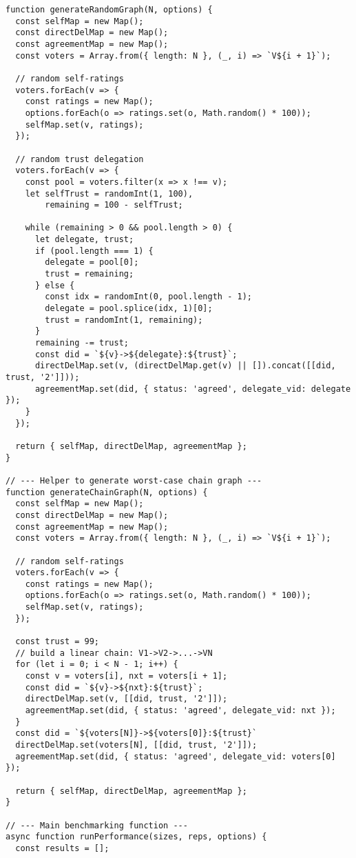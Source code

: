 \begin{verbatim}
function generateRandomGraph(N, options) {
  const selfMap = new Map();
  const directDelMap = new Map();
  const agreementMap = new Map();
  const voters = Array.from({ length: N }, (_, i) => `V${i + 1}`);

  // random self-ratings
  voters.forEach(v => {
    const ratings = new Map();
    options.forEach(o => ratings.set(o, Math.random() * 100));
    selfMap.set(v, ratings);
  });

  // random trust delegation
  voters.forEach(v => {
    const pool = voters.filter(x => x !== v);
    let selfTrust = randomInt(1, 100),
        remaining = 100 - selfTrust;

    while (remaining > 0 && pool.length > 0) {
      let delegate, trust;
      if (pool.length === 1) {
        delegate = pool[0];
        trust = remaining;
      } else {
        const idx = randomInt(0, pool.length - 1);
        delegate = pool.splice(idx, 1)[0];
        trust = randomInt(1, remaining);
      }
      remaining -= trust;
      const did = `${v}->${delegate}:${trust}`;
      directDelMap.set(v, (directDelMap.get(v) || []).concat([[did, trust, '2']]));
      agreementMap.set(did, { status: 'agreed', delegate_vid: delegate });
    }
  });

  return { selfMap, directDelMap, agreementMap };
}

// --- Helper to generate worst-case chain graph ---
function generateChainGraph(N, options) {
  const selfMap = new Map();
  const directDelMap = new Map();
  const agreementMap = new Map();
  const voters = Array.from({ length: N }, (_, i) => `V${i + 1}`);

  // random self-ratings
  voters.forEach(v => {
    const ratings = new Map();
    options.forEach(o => ratings.set(o, Math.random() * 100));
    selfMap.set(v, ratings);
  });

  const trust = 99;
  // build a linear chain: V1->V2->...->VN
  for (let i = 0; i < N - 1; i++) {
    const v = voters[i], nxt = voters[i + 1];
    const did = `${v}->${nxt}:${trust}`;
    directDelMap.set(v, [[did, trust, '2']]);
    agreementMap.set(did, { status: 'agreed', delegate_vid: nxt });
  }
  const did = `${voters[N]}->${voters[0]}:${trust}`
  directDelMap.set(voters[N], [[did, trust, '2']]);
  agreementMap.set(did, { status: 'agreed', delegate_vid: voters[0] });

  return { selfMap, directDelMap, agreementMap };
}

// --- Main benchmarking function ---
async function runPerformance(sizes, reps, options) {
  const results = [];


\end{verbatim}
